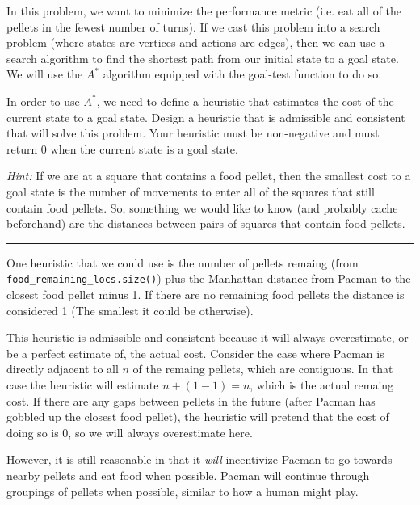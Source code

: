 \documentclass[11pt]{article}
\begin{document}
\noindent In this problem, we want to minimize the performance metric (i.e. eat all of the pellets in the fewest number of turns). If we cast this problem into a search problem (where states are vertices and actions are edges), then we can use a search algorithm to find the shortest path from our initial state to a goal state. We will use the $A^*$ algorithm equipped with the goal-test function to do so.\newline

\noindent In order to use $A^*$, we need to define a heuristic that estimates the cost of the current state to a goal state. Design a heuristic that is admissible and consistent that will solve this problem. Your heuristic must be non-negative and must return 0 when the current state is a goal state.\newline\newline

\noindent\textit{Hint:} If we are at a square that contains a food pellet, then the smallest cost to a goal state is the number of movements to enter all of the squares that still contain food pellets. So, something we would like to know (and probably cache beforehand) are the distances between pairs of squares that contain food pellets.

\medskip
\hrule
\medskip


One heuristic that we could use is the number of pellets remaing (from \texttt{food\_remaining\_locs.size()}) plus the Manhattan distance from Pacman to the closest food pellet minus 1. If there are no remaining food pellets the distance is considered 1 (The smallest it could be otherwise).

This heuristic is admissible and consistent because it will always overestimate, or be a perfect estimate of, the actual cost. Consider the case where Pacman is directly adjacent to all $n$ of the remaing pellets, which are contiguous. In that case the heuristic will estimate $n + (1 - 1) = n$, which is the actual remaing cost. If there are any gaps between pellets in the future (after Pacman has gobbled up the closest food pellet), the heuristic will pretend that the cost of doing so is 0, so we will always overestimate here.

However, it is still reasonable in that it \textit{will} incentivize Pacman to go towards nearby pellets and eat food when possible. Pacman will continue through groupings of pellets when possible, similar to how a human might play.
\end{document}
